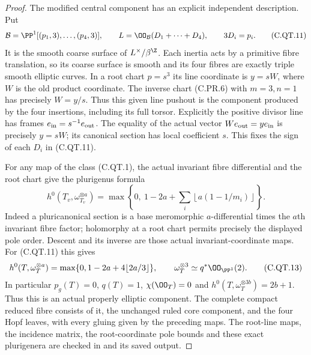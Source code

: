 \begin{proof}
The modified central component
has an explicit independent
description. Put
\[
 \mathcal B=\PP^1[(p_1,3),\ldots,(p_4,3)],\qquad
 L=\OO_{\mathcal B}(D_1+\cdots+D_4),
 \qquad 3D_i=p_i.
\tag{C.QT.11}
\]
It is the smooth coarse surface
of $L^\times/\beta^{\Z}$.
Each inertia acts by a primitive
fibre translation, so its coarse
surface is smooth and its four
fibres are exactly triple smooth
elliptic curves. In a root chart
$p=s^3$ its line coordinate is
$y=sW$, where $W$ is the old
product coordinate. The inverse
chart (C.PR.6) with $m=3,n=1$
has precisely $W=y/s$.
Thus this given line pushout
is the component produced by
the four insertions, including
its full torsor.
Explicitly the positive divisor
line has frames $e_{\rm in}=s^{-1}e_{\rm out}$.
The equality of the actual vector
$W e_{\rm out}=y e_{\rm in}$
is precisely $y=sW$; its canonical
section has local coefficient $s$.
This fixes the sign of each $D_i$
in (C.QT.11).

For any map of the class
(C.QT.1), the actual invariant
fibre differential and the
root chart give the plurigenus
formula
\[
 h^0(T_v,\omega_{T_v}^{\otimes a})
 =\max\left\{0,\ 1-2a+
       \sum_i\left\lfloor
                    a(1-1/m_i)\right\rfloor\right\}.
\tag{C.QT.12}
\]
Indeed a pluricanonical section
is a base meromorphic
$a$-differential times the
$a$th invariant fibre factor;
holomorphy at a root chart
permits precisely the displayed
pole order. Descent and its
inverse are those actual
invariant-coordinate maps.
For (C.QT.11) this gives
\[
 h^0(T,\omega_T^{\otimes a})
    =\max\{0,1-2a+4\lfloor2a/3\rfloor\},
 \qquad \omega_T^{\otimes3}\simeq q^*\OO_{\PP^1}(2).
\tag{C.QT.13}
\]
In particular $p_g(T)=0$,
$q(T)=1$, $\chi(\OO_T)=0$
and $h^0(T,\omega_T^{\otimes3b})=2b+1$.
Thus this is an actual properly
elliptic component. The complete
compact reduced fibre consists
of it, the unchanged ruled core
component, and the four Hopf
leaves, with every gluing given
by the preceding maps.
The root-line maps, the incidence
matrix, the root-coordinate pole
bounds and these exact plurigenera
are checked in
and its saved output.
\end{proof}
